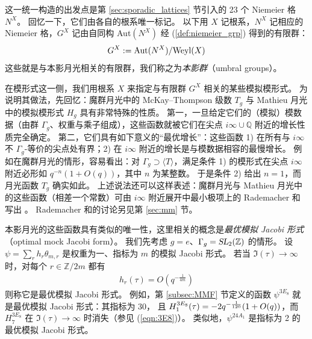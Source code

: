 \documentclass[11pt,a4paper,fontset=windows]{ctexart}
\numberwithin{equation}{section}
\newcommand{\SL}{\operatorname{\textsl{SL}}}      %
\newcommand{\QQ}{\mathbb{Q}}
\newcommand{\ZZ}{\mathbb{Z}}
\def\t{\tau}
\newcommand{\be}{\begin{equation}}
\newcommand{\ee}{\end{equation}}
\newcommand{\eq}[1]{(\ref{#1})}
\begin{document}

这一统一构造的出发点是第 \ref{sec:sporadic_lattices} 节引入的 23 个 Niemeier 格 $N^X$。
回忆一下，它们由各自的根系唯一标记。
以下用 $X$ 记根系，$N^X$ 记相应的 Niemeier 格，$G^X$ 记由自同构 Aut$(N^X)$ 经 \eq{def:niemeier_grp} 得到的有限群：
\be\label{eqn:def_um_grp}
G^X := {\rm Aut}(N^X)/ {\rm Weyl}(X)
\ee
这些就是与本影月光相关的有限群，我们称之为\emph{本影群}（umbral groups）。


在模形式这一侧，我们用根系 $X$ 来指定与有限群 $G^X$ 相关的某些模拟模形式。
为说明其做法，先回忆：魔群月光中的 McKay--Thompson 级数 $T_g$ 与 Mathieu 月光中的模拟模形式 $H_g$ 具有非常特殊的性质。
第一，一旦给定它们的（模拟）模数据（由群 $\Gamma_g$、权重与乘子组成），这些函数就被它们在尖点 $i\infty\cup \QQ$ 附近的增长性质完全确定。
第二，它们具有如下意义的“最优增长”：这些函数 1) 在所有与 $i\infty$ 不 $\Gamma_g$-等价的尖点处有界；2) 在 $i\infty$ 附近的增长是与模数据相容的最慢增长。
例如在魔群月光的情形，容易看出：对 $\Gamma_g\supset \langle T \rangle$，满足条件 1) 的模形式在尖点 $i\infty$ 附近必形如 $q^{-n}(1+ O(q))$，其中 $n$ 为某整数。
于是条件 2) 给出 $n=1$，而月光函数 $T_g$ 确实如此。
上述说法还可以这样表述：魔群月光与 Mathieu 月光中的这些函数（相差一个常数）可由 $i\infty$ 附近展开中最小极项上的 Rademacher 和写出 \cite{DunFre_RSMG,cheng2012rademacher}。
Rademacher 和的讨论另见第 \ref{sec:mm} 节。


本影月光的这些函数具有类似的唯一性，这里相关的概念是\emph{最优模拟 Jacobi 形式}（optimal mock Jacobi form）。
我们先考虑 $g=e$、$\Gamma_g = \SL_2(\ZZ)$ 的情形。
设 $\psi=\sum_r h_r\theta_{m,r}$ 是权重为一、指标为 $m$ 的模拟 Jacobi 形式。
若当 $\Im(\t)\to \infty$ 时，对每个 $r\in\ZZ/2m$ 都有
\begin{gather}\label{eqn:intro:opt}
h_r(\tau)=O(q^{-\frac1{4m}})
\end{gather} 
则称它是最优模拟 Jacobi 形式。
例如，第 \ref{subsec:MMF} 节定义的函数 $\psi^{3E_8}$ 就是最优模拟 Jacobi 形式：其指标为 30，
且 $H_1^{3E_8}(\t)= -2q^{-{1\over120}}( 1+O(q))$，而 $H_7^{3E_8}$ 在 $\Im(\t)\to \infty$ 时消失（参见 \eq{eqn:3E8}）。
类似地，$\psi^{24A_1}$ 是指标为 2 的最优模拟 Jacobi 形式。
\end{document}
